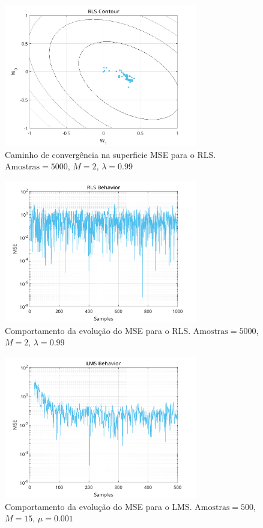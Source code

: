 \documentclass[a4paper,10pt]{article}
\begin{document}
\begin{enumerate}
				\begin{figure}[H]
					\centering
					\includegraphics[width=0.75\textwidth]{figs/rls_contour.png}
					\caption{Caminho de convergência na superficie MSE para o RLS. $\text{Amostras} = 5000$, $M = 2$, $\lambda = 0.99$}
					\label{fig:rls_contour}
				\end{figure}

				\begin{figure}[H]
					\centering
					\includegraphics[width=0.75\textwidth]{figs/rls_mse.png}
					\caption{Comportamento da evolução do MSE para o RLS. $\text{Amostras} = 5000$, $M = 2$, $\lambda = 0.99$}
					\label{fig:rls_mse}
				\end{figure}

				\begin{figure}[H]
					\centering
					\includegraphics[width=0.75\textwidth]{figs/L4Q5_lms.png}
					\caption{Comportamento da evolução do MSE para o LMS. $\text{Amostras} = 500$, $M = 15$, $\mu = 0.001$}
					\label{fig:L4Q5_a1}
				\end{figure}


\end{enumerate}
\end{document}

